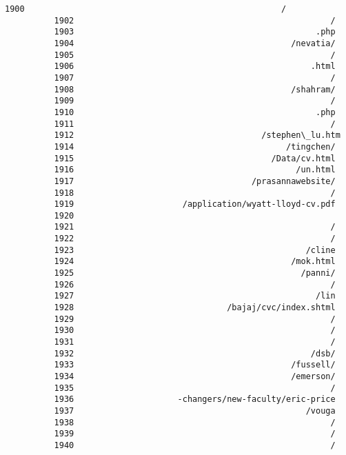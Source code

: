 \documentclass[11pt]{article}
\begin{document}
\begin{Verbatim}[commandchars=\\\{\}]
          1900                                                    /
          1902                                                    /
          1903                                                 .php
          1904                                            /nevatia/
          1905                                                    /
          1906                                                .html
          1907                                                    /
          1908                                            /shahram/
          1909                                                    /
          1910                                                 .php
          1911                                                    /
          1912                                      /stephen\_lu.htm
          1914                                           /tingchen/
          1915                                        /Data/cv.html
          1916                                             /un.html
          1917                                    /prasannawebsite/
          1918                                                    /
          1919                      /application/wyatt-lloyd-cv.pdf
          1920                                                     
          1921                                                    /
          1922                                                    /
          1923                                               /cline
          1924                                            /mok.html
          1925                                              /panni/
          1926                                                    /
          1927                                                 /lin
          1928                               /bajaj/cvc/index.shtml
          1929                                                    /
          1930                                                    /
          1931                                                    /
          1932                                                /dsb/
          1933                                            /fussell/
          1934                                            /emerson/
          1935                                                    /
          1936                     -changers/new-faculty/eric-price
          1937                                               /vouga
          1938                                                    /
          1939                                                    /
          1940                                                    /

\end{Verbatim}
\end{document}
